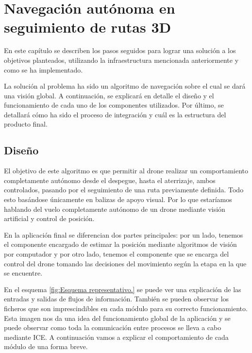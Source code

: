 \chapter{Navegación autónoma en seguimiento de rutas 3D}\label{cap.desarrollo}
\hspace{1cm} En este capítulo se describen los pasos seguidos para lograr una solución a los objetivos planteados, utilizando la infraestructura mencionada anteriormente y como se ha implementado.

\hspace{1cm} La solución al problema ha sido un algoritmo de navegación sobre el cual se dará una visión global. A continuación, se explicará en detalle el diseño y el funcionamiento de cada uno de los componentes utilizados. Por último, se detallará cómo ha sido el proceso de integración y cuál es la estructura del producto final.


\section{Diseño}
\hspace{1cm} El objetivo de este algoritmo es que permitir al drone realizar un comportamiento completamente autónomo desde el despegue, hasta el aterrizaje, ambos controlados, pasando por el seguimiento de una ruta previamente definida. Todo esto basándose únicamente en balizas de apoyo visual. Por lo que estaríamos hablando del vuelo completamente autónomo de un drone mediante visión artificial y control de posición.

\hspace{1cm} En la aplicación final se diferencian dos partes principales: por un lado, tenemos el componente encargado de estimar la posición mediante algoritmos de visión por computador y por otro lado, tenemos el componente que se encarga del control del drone tomando las decisiones del movimiento según la etapa en la que se encuentre.

\hspace{1cm} En el esquema \ref{fig:Esquema representativo.} se puede ver una explicación de las entradas y salidas de flujos de información. También se pueden observar los ficheros que son imprescindibles en cada módulo para su correcto funcionamiento. Esta imagen nos da una idea del funcionamiento global de la aplicación y se puede observar como toda la comunicación entre procesos se lleva a cabo mediante ICE. A continuación vamos a explicar el comportamiento de cada módulo de una forma breve. 

